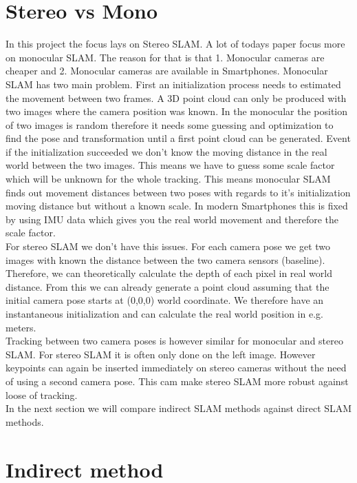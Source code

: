\documentclass[11pt,a4paper,titlepage,oneside]{report}
\begin{document}

\section{Stereo vs Mono}

In this project the focus lays on Stereo SLAM. A lot of todays paper focus more on monocular SLAM. The reason for that is that 1. Monocular cameras are cheaper and 2. Monocular cameras are available in Smartphones. Monocular SLAM has two main problem. First an initialization process needs to estimated the movement between two frames. A 3D point cloud can only be produced with two images where the camera position was known. In the monocular the position of two images is random therefore it needs some guessing and optimization to find the pose and transformation until a first point cloud can be generated. Event if the initialization succeeded we don't know the moving distance in the real world between the two images. This means we have to guess some scale factor which will be unknown for the whole tracking. This means monocular SLAM finds out movement distances between two poses with regards to it's initialization moving distance but without a known scale. In modern Smartphones this is fixed by using IMU data which gives you the real world movement and therefore the scale factor.\\
For stereo SLAM we don't have this issues. For each camera pose we get two images with known the distance between the two camera sensors (baseline). Therefore, we can theoretically calculate the depth of each pixel in real world distance. From this we can already generate a point cloud assuming that the initial camera pose starts at (0,0,0) world coordinate. We therefore have an instantaneous initialization and can calculate the real world position in e.g. meters.\\
Tracking between two camera poses is however similar for monocular and stereo SLAM. For stereo SLAM it is often only done on the left image. However keypoints can again be inserted immediately on stereo cameras without the need of using a second camera pose. This cam make stereo SLAM more robust against loose of tracking.\\
In the next section we will compare indirect SLAM methods against direct SLAM methods.

\section{Indirect method}
\end{document}
